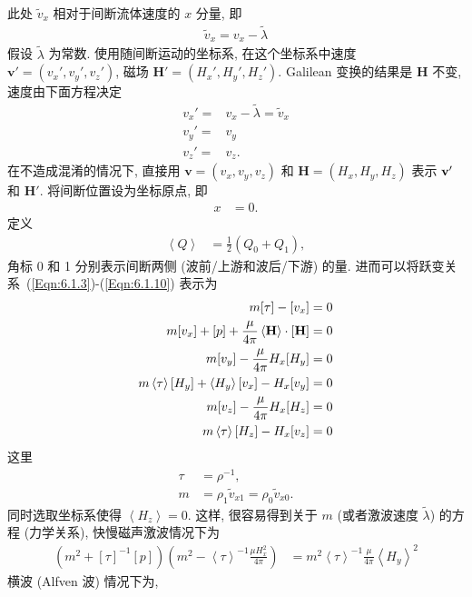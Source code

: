 \documentclass[10.5pt
]{article}
\begin{document}
此处 $\tilde v_x$ 相对于间断流体速度的 $x$ 分量, 即
\begin{align}
\tilde v_x = v_x - \tilde\lambda
\end{align}
假设 $\tilde\lambda$ 为常数. 使用随间断运动的坐标系,
在这个坐标系中速度 $\boldsymbol{v}' = (v_x', v_y', v_z')$, 磁场 $\boldsymbol{H'} = (H_x', H_y',
H_z')$. Galilean 变换的结果是 $\boldsymbol{H}$ 不变, 速度由下面方程决定
\begin{align*}
v_x' = & v_x - \tilde\lambda = \tilde v_x \\
v_y' = & v_y \\
v_z' = & v_z. 
\end{align*}
在不造成混淆的情况下, 直接用 $\boldsymbol{v} = (v_x, v_y, v_z)$ 和 $\boldsymbol{H} = (H_x, H_y, H_z)$ 表示 ${\bf
v'}$ 和 $\boldsymbol{H}'$. 将间断位置设为坐标原点, 即
\begin{align*}
x &= 0.
\end{align*}
定义
\begin{align*}
\left<Q\right> &= \frac{1}{2}(Q_0 + Q_1),
\end{align*}
角标 0 和 1 分别表示间断两侧 (波前/上游和波后/下游) 的量. 进而可以将跃变关系~(\ref{Eqn:6.1.3})-(\ref{Eqn:6.1.10}) 表示为
\begin{align}
m[\tau] - [v_x] &= 0 \label{Eqn:6.1.4a}
\\
m[v_x] + [p] + \frac{\mu}{4\pi} \left< \bf H \right> \cdot [\bf H ] &=
0\label{Eqn:6.1.5a}
\\
m[v_y] - \frac{\mu}{4\pi} H_x [H_y] &= 0\label{Eqn:6.1.7a}
\\
m \left<\tau \right> [H_y] + \left< H_y \right> [v_x] - H_x [v_y] &= 0\label{Eqn:6.1.8a}
\\
m [v_z] - \frac{\mu}{4\pi} H_x [H_z] &= 0
\\
m \left< \tau \right> [H_z] - H_x [v_z] &= 0\label{Eqn:6.1.10a}
\end{align}
这里 
\begin{align}
  \tau &= \rho^{-1},
  \\
  m &= \rho_1 \tilde v_{x1} = \rho_0 \tilde v_{x0}.
\end{align}
同时选取坐标系使得 $\left< H_z \right> = 0$. 这样, 很容易得到关于 $m$
(或者激波速度 $\tilde\lambda$) 的方程 (力学关系), 快慢磁声激波情况下为
\begin{align}
(m^2 + [\tau]^{-1}[p]) \left( m^2 - \left<\tau\right>^{-1} \frac{\mu H_x^2}{4\pi} \right)
&= m^2 \left<\tau\right>^{-1} \frac{\mu}{4\pi}
\left<H_y\right>^2\label{Eqn:6.1.13}
\end{align}
横波 (Alfven 波) 情况下为,
\end{document}
